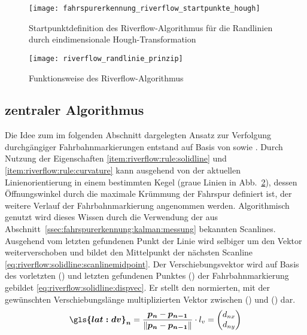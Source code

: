 \begin{figure}[htbp]
	\centering
	\texttt{[image: fahrspurerkennung\_riverflow\_startpunkte\_hough]}
	\caption{Startpunktdefinition des Riverflow-Algorithmus für die Randlinien durch eindimensionale Hough-Transformation}
	\label{fig:riverflow:randlinien:startpoints:hough}
\end{figure}

\begin{figure}[htbp]
  \centering
  \texttt{[image: riverflow\_randlinie\_prinzip]}
  \caption{Funktionsweise des Riverflow-Algorithmus}
  \label{fig:riverflow:randlinie:prinzip}
\end{figure}

\subsection{zentraler Algorithmus}
\label{sssec:fahrspurerkennung:riverflow:randlinie:zentraler_algorithmus}
Die Idee zum im folgenden Abschnitt dargelegten Ansatz zur Verfolgung durchgängiger Fahrbahnmarkierungen entstand auf Basis von \autocite{drauschkeEchtzeitfaehigeStartpunktalgorithmenFuer2016} sowie \autocite{limRiverFlowLane2012}.
Durch Nutzung der Eigenschaften \ref{item:riverflow:rule:solidline} und  \ref{item:riverflow:rule:curvature} kann ausgehend von der aktuellen Linienorientierung in einem bestimmten Kegel (graue Linien in Abb.~\ref{fig:riverflow:randlinie:prinzip}), dessen Öffnungswinkel durch die maximale Krümmung der Fahrspur definiert ist, der weitere Verlauf der Fahrbahnmarkierung angenommen werden.
Algorithmisch genutzt wird dieses Wissen durch die Verwendung der aus Abschnitt~\ref{ssec:fahrspurerkennung:kalman:messung} bekannten Scanlines.
Ausgehend vom letzten gefundenen Punkt der Linie  wird selbiger um den Vektor  weiterverschoben und bildet den Mittelpunkt   der nächsten Scanline \eqref{eq:riverflow:solidline:scanlinemidpoint}. Der Verschiebungsvektor  wird auf Basis des vorletzten () und letzten gefundenen Punktes () der Fahrbahnmarkierung gebildet \eqref{eq:riverflow:solidline:dispvec}. Er stellt den normierten, mit der gewünschten Verschiebungslänge  multiplizierten Vektor zwischen () und () dar.
\begin{equation}
\label{eq:riverflow:solidline:dispvec}
\vct{\gls{lat:dv}_n} =  \frac{\pnt{p_{n}} - \pnt{p_{n-1}}}{\nrm{\pnt{p_{n}} - \pnt{p_{n-1}}}} \cdot \scl{l_v}
= 
\begin{pmatrix}
\scl{d_{nx}} \\
\scl{d_{ny}}
\end{pmatrix}
\end{equation}
